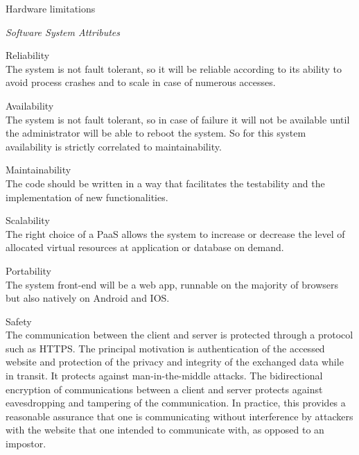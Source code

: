 \documentclass{article}
\begin{document}
\begin{legal}
\begin{legal}
\begin{legal}
			\item Hardware limitations\\
			\end{legal}
    		\item \textit{Software System Attributes }\\
		\begin{legal}\bfseries
			\item Reliability\\
			{\normalfont The system is not fault tolerant, so it will be reliable according to its ability to avoid process crashes and to scale in case of numerous accesses.}
			\\
			\item Availability\\
			{\normalfont The system is not fault tolerant, so in case of failure it will not be available until the administrator will be able to reboot the system. So for this system availability is strictly correlated to maintainability.}
			\\
			\item Maintainability\\
			{\normalfont The code should be written in a way that facilitates the testability and the implementation of new functionalities.}
			\\
			\item Scalability\\
			{\normalfont The right choice of a PaaS allows the system to increase or decrease the level of allocated virtual resources at application or database on demand.}
			\\
			\item Portability\\
			{\normalfont The system front-end will be a web app, runnable on the majority of browsers but also natively on Android and IOS.}
			\\
			\item Safety\\
			{\normalfont The communication between the client and server is protected through a protocol such as HTTPS. The principal motivation is authentication of the accessed website and protection of the privacy and integrity of the exchanged data while in transit. It protects against man-in-the-middle attacks. The bidirectional encryption of communications between a client and server protects against eavesdropping and tampering of the communication. In practice, this provides a reasonable assurance that one is communicating without interference by attackers with the website that one intended to communicate with, as opposed to an impostor. 			}

\end{legal}
\end{legal}
\end{legal}
\end{document}

